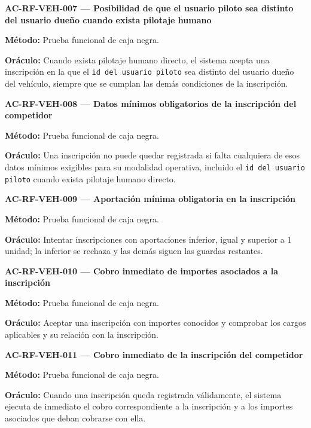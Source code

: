 \documentclass[10pt,letterpaper]{article}
\begin{document}
\noindent\textbf{AC-RF-VEH-007 --- Posibilidad de que el usuario piloto sea distinto del usuario dueño cuando exista pilotaje humano}\par
\textbf{Método:} Prueba funcional de caja negra.\par
\textbf{Oráculo:} Cuando exista pilotaje humano directo, el sistema acepta una inscripción en la que el \texttt{id del usuario piloto} sea distinto del usuario dueño del vehículo, siempre que se cumplan las demás condiciones de la inscripción.\par\vspace{0.45em}
\noindent\textbf{AC-RF-VEH-008 --- Datos mínimos obligatorios de la inscripción del competidor}\par
\textbf{Método:} Prueba funcional de caja negra.\par
\textbf{Oráculo:} Una inscripción no puede quedar registrada si falta cualquiera de esos datos mínimos exigibles para su modalidad operativa, incluido el \texttt{id del usuario piloto} cuando exista pilotaje humano directo.\par\vspace{0.45em}
\noindent\textbf{AC-RF-VEH-009 --- Aportación mínima obligatoria en la inscripción}\par
\textbf{Método:} Prueba funcional de caja negra.\par
\textbf{Oráculo:} Intentar inscripciones con aportaciones inferior, igual y superior a 1 unidad; la inferior se rechaza y las demás siguen las guardas restantes.\par\vspace{0.45em}
\noindent\textbf{AC-RF-VEH-010 --- Cobro inmediato de importes asociados a la inscripción}\par
\textbf{Método:} Prueba funcional de caja negra.\par
\textbf{Oráculo:} Aceptar una inscripción con importes conocidos y comprobar los cargos aplicables y su relación con la inscripción.\par\vspace{0.45em}
\noindent\textbf{AC-RF-VEH-011 --- Cobro inmediato de la inscripción del competidor}\par
\textbf{Método:} Prueba funcional de caja negra.\par
\textbf{Oráculo:} Cuando una inscripción queda registrada válidamente, el sistema ejecuta de inmediato el cobro correspondiente a la inscripción y a los importes asociados que deban cobrarse con ella.\par\vspace{0.45em}
\end{document}
